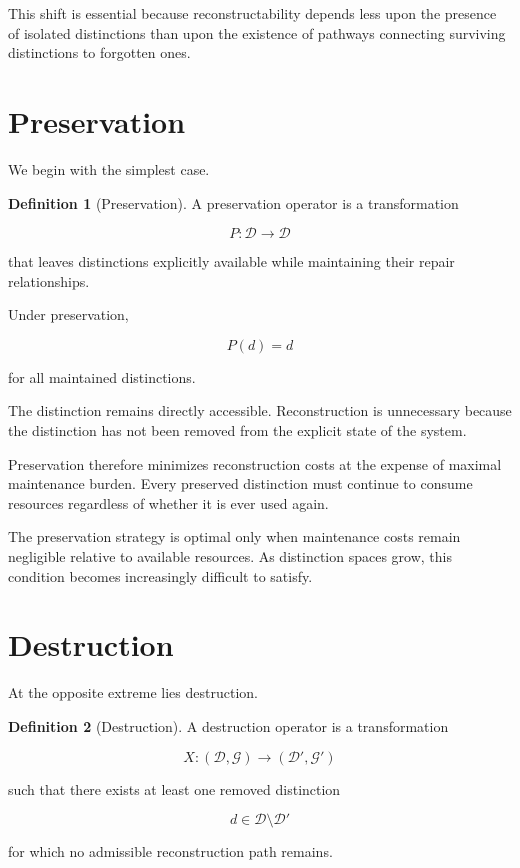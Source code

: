 \documentclass[12pt,oneside]{book}
\theoremstyle{plain} \newtheorem{theorem}{Theorem}[chapter] \newtheorem{lemma}[theorem]{Lemma} \newtheorem{proposition}[theorem]{Proposition} \newtheorem{corollary}[theorem]{Corollary}
\theoremstyle{definition} \newtheorem{definition}[theorem]{Definition} \newtheorem{axiom}[theorem]{Axiom} \newtheorem{construction}[theorem]{Construction}
\theoremstyle{remark} \newtheorem{remark}[theorem]{Remark} \newtheorem{example}[theorem]{Example}
\newcommand{\D}{\mathcal{D}} \newcommand{\R}{\mathcal{R}} \newcommand{\F}{\mathcal{F}} \newcommand{\U}{\mathcal{U}} \newcommand{\M}{\mathcal{M}} \newcommand{\G}{\Gamma}
\begin{document}
This shift is essential because reconstructability depends less upon the presence of isolated distinctions than upon the existence of pathways connecting surviving distinctions to forgotten ones.

\section{Preservation}

We begin with the simplest case.

\begin{definition}[Preservation]
A preservation operator is a transformation

\[
P:\D\rightarrow\D
\]

that leaves distinctions explicitly available while maintaining their repair relationships.
\end{definition}

Under preservation,

\[
P(d)=d
\]

for all maintained distinctions.

The distinction remains directly accessible. Reconstruction is unnecessary because the distinction has not been removed from the explicit state of the system.

Preservation therefore minimizes reconstruction costs at the expense of maximal maintenance burden. Every preserved distinction must continue to consume resources regardless of whether it is ever used again.

The preservation strategy is optimal only when maintenance costs remain negligible relative to available resources. As distinction spaces grow, this condition becomes increasingly difficult to satisfy.

\section{Destruction}

At the opposite extreme lies destruction.

\begin{definition}[Destruction]
A destruction operator is a transformation

\[
X:(\D,\mathcal G)
\rightarrow
(\D',\mathcal G')
\]

such that there exists at least one removed distinction

\[
d\in \D\setminus\D'
\]

for which no admissible reconstruction path remains.
\end{definition}
\end{document}
